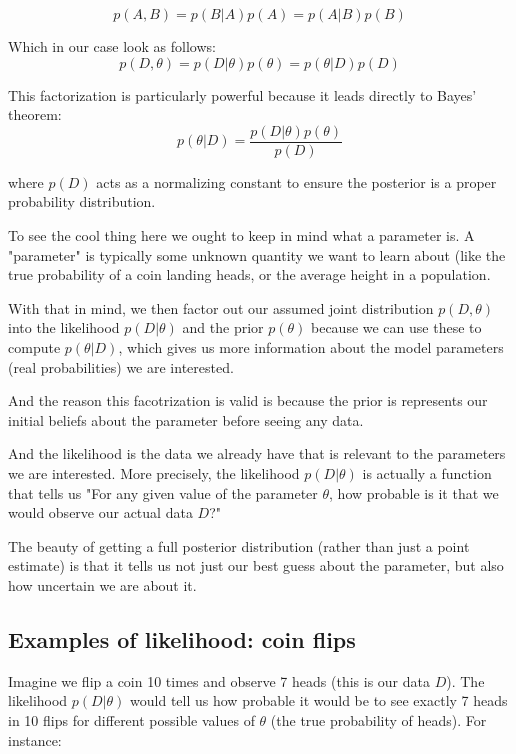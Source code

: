 $$
p(A, B) = p(B|A) p(A) = p(A|B) p(B)
$$

Which in our case look as follows:
$$
p(D, \theta)
= p(D|\theta) p(\theta)
= p(\theta | D) p(D)
$$

This factorization is particularly powerful because it leads directly to Bayes' theorem:
$$
p(\theta |D) = \frac{ p(D|\theta) p(\theta) }{p(D)}
$$

where $p(D)$ acts as a normalizing constant to ensure the posterior is a proper probability distribution.

To see the cool thing here we ought to keep in mind what a parameter is.
A "parameter" is typically some unknown quantity we want to learn about
(like the true probability of a coin landing heads, or the average height in a population.

With that in mind, we then factor out our assumed joint distribution $p(D, \theta)$ into the likelihood
$p(D|\theta)$ and the prior $p(\theta)$ because we can use these to compute $p(\theta |D)$,
which gives us more information about the model parameters (real probabilities) we are interested.

And the reason this facotrization is valid is because the prior is
represents our initial beliefs about the parameter before seeing any data.



And the likelihood is the data we already have that is relevant to the parameters we are interested.
More precisely, the likelihood $p(D|\theta)$ is actually a function that tells us
"For any given value of the parameter $\theta$, how probable is it that we would observe our actual
data $D$?"


The beauty of getting a full posterior distribution (rather than just a point estimate)
is that it tells us not just our best guess about the parameter, but also how uncertain we are about it.



\subsection{Examples of likelihood: coin flips}

Imagine we flip a coin 10 times and observe 7 heads (this is our data $D$). The likelihood $p(D|\theta)$ would tell us how probable it would be to see exactly 7 heads in 10 flips for different possible values of $\theta$ (the true probability of heads).
For instance:

